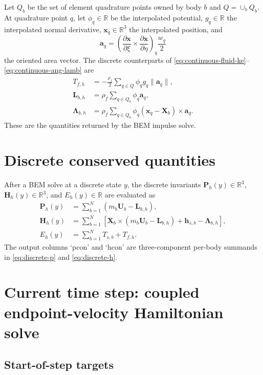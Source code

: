 \documentclass[11pt,a4paper]{article}
\newcommand{\R}{\mathbb{R}}
\newcommand{\bx}{\bm{x}}
\newcommand{\bX}{\bm{X}}
\newcommand{\bU}{\bm{U}}
\newcommand{\bL}{\bm{L}}
\newcommand{\bLam}{\bm{\Lambda}}
\newcommand{\bh}{\bm{h}}
\newcommand{\bP}{\bm{P}}
\newcommand{\bH}{\bm{H}}
\begin{document}
Let $Q_b$ be the set of element quadrature points owned by body $b$ and
$Q=\cup_b Q_b$.  At quadrature point $q$, let $\phi_q\in\R$ be the interpolated
potential, $g_q\in\R$ the interpolated normal derivative, $\bx_q\in\R^3$ the
interpolated position, and
\begin{equation}
  \bm{a}_q
  =
  \left(
    \frac{\partial\bx}{\partial\xi}
    \times
    \frac{\partial\bx}{\partial\eta}
  \right)_q
  \frac{w_q}{2}
\end{equation}
the oriented area vector.  The discrete counterparts of
\eqref{eq:continuous-fluid-ke}--\eqref{eq:continuous-ang-lamb} are
\begin{align}
  T_{f,h}
  &=
  -\frac{\rho_f}{2}
  \sum_{q\in Q}
  \phi_q g_q \|\bm{a}_q\|,
  \label{eq:discrete-fluid-ke}\\
  \bL_{b,h}
  &=
  \rho_f\sum_{q\in Q_b}\phi_q\bm{a}_q,
  \label{eq:discrete-lin-lamb}\\
  \bLam_{b,h}
  &=
  \rho_f\sum_{q\in Q_b}
  \phi_q(\bx_q-\bX_b)\times\bm{a}_q .
  \label{eq:discrete-ang-lamb}
\end{align}
These are the quantities returned by the BEM impulse solve.

\section{Discrete conserved quantities}

After a BEM solve at a discrete state $y$, the discrete invariants
$\bP_h(y)\in\R^3$, $\bH_h(y)\in\R^3$, and $E_h(y)\in\R$ are evaluated as
\begin{align}
  \bP_h(y)
  &=
  \sum_{b=1}^N
  \left(m_b\bU_b-\bL_{b,h}\right),
  \label{eq:discrete-p}\\
  \bH_h(y)
  &=
  \sum_{b=1}^N
  \left[
    \bX_b\times\left(m_b\bU_b-\bL_{b,h}\right)
    +\bh_{s,b}
    -\bLam_{b,h}
  \right],
  \label{eq:discrete-h}\\
  E_h(y)
  &=
  \sum_{b=1}^N T_{s,b}+T_{f,h}.
  \label{eq:discrete-energy}
\end{align}
The output columns `pcon' and `hcon' are three-component per-body summands in
\eqref{eq:discrete-p} and \eqref{eq:discrete-h}.

\section{Current time step: coupled endpoint-velocity Hamiltonian solve}

\subsection{Start-of-step targets}
\end{document}
